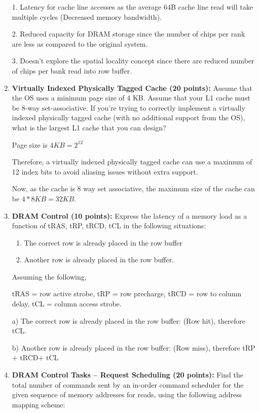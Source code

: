 \documentclass[a4paper, 11pt]{exam}
\begin{document}
\begin{enumerate}
1. Latency for cache line accesses as the average 64B cache line read will take multiple cycles (Decreased memory bandwidth).

2. Reduced capacity for DRAM storage since the number of chips per rank are less as compared to the original system.

3. Doesn't explore the spatial locality concept since there are reduced number of chips per bank read into row buffer.

\item \textbf {Virtually Indexed Physically Tagged Cache (20 points): }  Assume that the OS uses a minimum page size of 4 KB. Assume that your L1 cache must be 8-way set-associative. If you're trying to correctly implement a virtually indexed physically tagged cache (with no additional support from the OS), what is the largest L1 cache that you can design? \newline

Page size is $4 KB =2^{12}$

Therefore, a virtually indexed physically tagged cache can use a maximum of 12 index bits to avoid aliasing issues without extra support.

Now, as the cache is 8 way set associative, the maximum size of the cache can be $4*8KB = 32KB$.


\item \textbf {DRAM Control (10 points): } Express the latency of a memory load as a function of tRAS, tRP, tRCD, tCL in the following situations:

 \begin{enumerate}
 \item  The correct row is already placed in the row buffer
 \item  Another row is already placed in the row buffer.
 \end{enumerate}

Assuming the following,

tRAS = row active strobe, tRP = row precharge, tRCD = row to column delay, tCL = column access strobe.

a) The correct row is already placed in the row buffer: (Row hit), therefore tCL.

b) Another row is already placed in the row buffer: (Row miss), therefore tRP + tRCD+ tCL

\item \textbf {DRAM Control Tasks – Request Scheduling (20 points): }  Find the total number of commands sent by an in-order command scheduler for the given sequence of memory addresses for reads, using the following address mapping scheme:


\end{enumerate}
\end{document}
